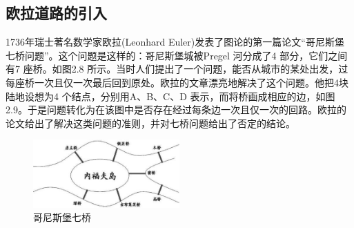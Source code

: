 \documentclass[11pt,a4paper,openany]{book}
\begin{document}
\subsection{欧拉道路的引入}
\indent 1736年瑞士著名数学家欧拉(Leonhard Euler)发表了图论的第一篇论文“哥尼斯堡七桥问题”。这个问题是这样的：哥尼斯堡城被Pregel 河分成了4 部分，它们之间有7 座桥。如图2.8 所示。当时人们提出了一个问题，能否从城市的某处出发，过每座桥一次且仅一次最后回到原处。欧拉的文章漂亮地解决了这个问题。他把4块陆地设想为4 个结点，分别用A、B、C、D 表示，而将桥画成相应的边，如图2.9。于是问题转化为在该图中是否存在经过每条边一次且仅一次的回路。欧拉的论文给出了解决这类问题的准则，并对七桥问题给出了否定的结论。\\
\begin{figure}[H]
  \centering
  \includegraphics[width=0.5\textwidth]{2.3.1.jpg}
  \caption*{哥尼斯堡七桥}
\end{figure}
\end{document}
